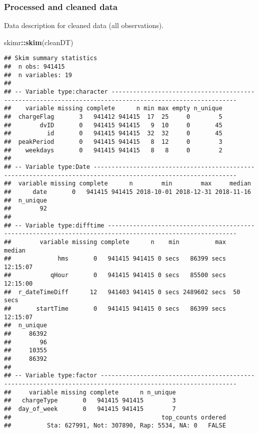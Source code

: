 \documentclass[]{article}
\newenvironment{Shaded}{\begin{snugshade}}{\end{snugshade}}
\newcommand{\KeywordTok}[1]{\textcolor[rgb]{0.13,0.29,0.53}{\textbf{#1}}}
\newcommand{\NormalTok}[1]{#1}
\newcommand{\OperatorTok}[1]{\textcolor[rgb]{0.81,0.36,0.00}{\textbf{#1}}}
\begin{document}
\hypertarget{processedCheck}{%
\subsubsection{Processed and cleaned data}\label{processedCheck}}

Data description for cleaned data (all observations).

\begin{Shaded}
\begin{Highlighting}[]
\NormalTok{skimr}\OperatorTok{::}\KeywordTok{skim}\NormalTok{(cleanDT)}
\end{Highlighting}
\end{Shaded}

\begin{verbatim}
## Skim summary statistics
##  n obs: 941415 
##  n variables: 19 
## 
## -- Variable type:character ---------------------------------------------------------------------------------------------------------
##    variable missing complete      n min max empty n_unique
##  chargeFlag       3   941412 941415  17  25     0        5
##        dvID       0   941415 941415   9  10     0       45
##          id       0   941415 941415  32  32     0       45
##  peakPeriod       0   941415 941415   8  12     0        3
##    weekdays       0   941415 941415   8   8     0        2
## 
## -- Variable type:Date --------------------------------------------------------------------------------------------------------------
##  variable missing complete      n        min        max     median
##      date       0   941415 941415 2018-10-01 2018-12-31 2018-11-16
##  n_unique
##        92
## 
## -- Variable type:difftime ----------------------------------------------------------------------------------------------------------
##        variable missing complete      n    min          max   median
##             hms       0   941415 941415 0 secs   86399 secs 12:15:07
##           qHour       0   941415 941415 0 secs   85500 secs 12:15:00
##  r_dateTimeDiff      12   941403 941415 0 secs 2489602 secs  50 secs
##       startTime       0   941415 941415 0 secs   86399 secs 12:15:07
##  n_unique
##     86392
##        96
##     10355
##     86392
## 
## -- Variable type:factor ------------------------------------------------------------------------------------------------------------
##     variable missing complete      n n_unique
##   chargeType       0   941415 941415        3
##  day_of_week       0   941415 941415        7
##                                          top_counts ordered
##          Sta: 627991, Not: 307890, Rap: 5534, NA: 0   FALSE

\end{verbatim}
\end{document}
